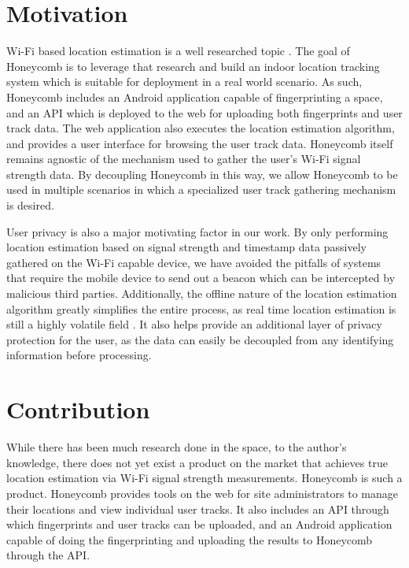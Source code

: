 \section{Motivation}
%

Wi-Fi based location estimation is a well researched topic \cite{liu2007survey}. The goal of Honeycomb is to leverage that research and build an indoor location tracking system which is suitable for deployment in a real world scenario.  As such, Honeycomb includes an Android application capable of fingerprinting a space, and an API which is deployed to the web for uploading both fingerprints and user track data. The web application also executes the location estimation algorithm, and provides a user interface for browsing the user track data. Honeycomb itself remains agnostic of the mechanism used to gather the user's Wi-Fi signal strength data. By decoupling Honeycomb in this way, we allow Honeycomb to be used in multiple scenarios in which a specialized user track gathering mechanism is desired. 

User privacy is also a major motivating factor in our work. By only performing location estimation based on signal strength and timestamp data passively gathered on the Wi-Fi capable device, we have avoided the pitfalls of systems that require the mobile device to send out a beacon \cite{ito2005bayesian} \cite{xiong2012towards} which can be intercepted by malicious third parties. Additionally, the offline nature of the location estimation algorithm greatly simplifies the entire process, as real time location estimation is still a highly volatile field \cite{turner2011empirical}. It also helps provide an additional layer of privacy protection for the user, as the data can easily be decoupled from any identifying information before processing.
 
 
\section{Contribution}
%

While there has been much research done in the space, to the author's knowledge, there does not yet exist a product on the market that achieves true location estimation via Wi-Fi signal strength measurements. Honeycomb is such a product. Honeycomb provides tools on the web for site administrators to manage their locations and view individual user tracks. It also includes an API through which fingerprints and user tracks can be uploaded, and an Android application capable of doing the fingerprinting and uploading the results to Honeycomb through the API. 


